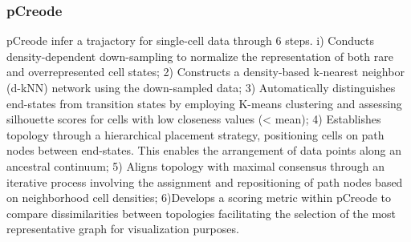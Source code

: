 \subsubsection{pCreode} 

pCreode infer a trajactory for single-cell data through 6 steps\citep{herring2018pCreode}. i) Conducts density-dependent down-sampling to normalize the representation of both rare and overrepresented cell states; 2) Constructs a density-based k-nearest neighbor (d-kNN) network using the down-sampled data; 3) Automatically distinguishes end-states from transition states by employing K-means clustering and assessing silhouette scores for cells with low closeness values (< mean); 4) Establishes topology through a hierarchical placement strategy, positioning cells on path nodes between end-states. This enables the arrangement of data points along an ancestral continuum; 5) Aligns topology with maximal consensus through an iterative process involving the assignment and repositioning of path nodes based on neighborhood cell densities; 6)Develops a scoring metric within pCreode to compare dissimilarities between topologies facilitating the selection of the most representative graph for visualization purposes.

